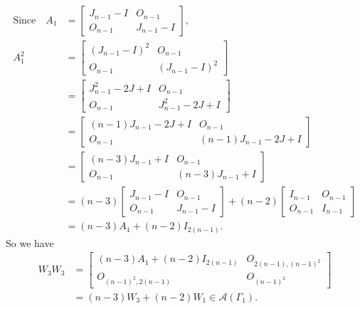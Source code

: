 \begin{itemize}
    \begin{align*}
        \text{Since}\quad A_1 &= \begin{bmatrix}
            J_{n-1}-I & O_{n-1} \\
            O_{n-1} & J_{n-1}-I
        \end{bmatrix}, \\
        A_1^2 &= \begin{bmatrix}
            (J_{n-1}-I)^2 & O_{n-1} \\
            O_{n-1} & (J_{n-1}-I)^2
        \end{bmatrix}\\
        &= \begin{bmatrix}
            J_{n-1}^2-2J+I & O_{n-1} \\
            O_{n-1} & J_{n-1}^2-2J+I
        \end{bmatrix} \\
        &= \begin{bmatrix}
            (n-1)J_{n-1}-2J+I & O_{n-1} \\
            O_{n-1} & (n-1)J_{n-1}-2J+I
        \end{bmatrix} \\
        &= \begin{bmatrix}
            (n-3)J_{n-1} + I & O_{n-1} \\
            O_{n-1} & (n-3)J_{n-1} + I
        \end{bmatrix} \\
        &= (n-3)\begin{bmatrix}
            J_{n-1} - I & O_{n-1} \\
            O_{n-1} & J_{n-1}-I
        \end{bmatrix} + (n-2)\begin{bmatrix}
            I_{n-1} & O_{n-1} \\
            O_{n-1} & I_{n-1}
        \end{bmatrix} \\
        &= (n-3)A_1 + (n-2)I_{2(n-1)}.
    \end{align*}
    So we have
    \begin{align*}
        W_3W_3
        &=\begin{bmatrix}
            (n-3)A_1+ (n-2)I_{2(n-1)} & O_{2(n-1), (n-1)^2} \\
            O_{(n-1)^2, 2(n-1)} & O_{(n-1)^2}
        \end{bmatrix} \\
        &= (n-3)W_3 + (n-2)W_1\in\mathcal{A}(\Gamma_1).
    \end{align*}
    

\end{itemize}
